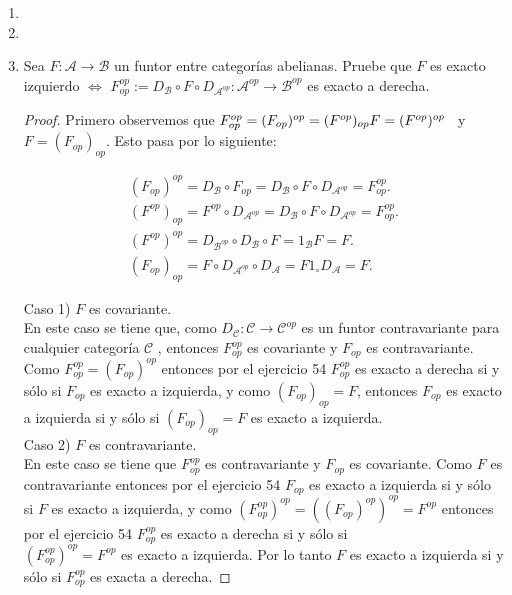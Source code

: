 \documentclass{article}
\begin{document}
\begin{enumerate}[label=\textbf{Ej \arabic*.}]
\begin{proof}
se demuestra de manera análoga a lo anterior.

\end{proof}

\item
\item

\item Sea $F:\mathscr{A}\longrightarrow \mathscr{B}$ un funtor entre categorías abelianas. Pruebe que $F$ es exacto izquierdo $\iff$ 
$F_{op}^{op}:=D_{\mathscr{B}}\circ F \circ  D_{\mathscr{A}^{op}}\colon \mathscr{A}^{op}\longrightarrow\mathscr{B}^{op}$ es exacto a 
derecha.
\begin{proof}
Primero observemos que $F_{op}^{op}=(F_{op})^{op}=(F^{op})_{op}\,\\ F=(F^{op})^{op}$\,\,\, y \,\,\, $F=(F_{op})_{op}$. 
Esto pasa por lo siguiente:

\begin{gather*}
(F_{op})^{op}=D_{\mathscr{B}}\circ F_{op}=D_{\mathscr{B}}\circ F\circ D_{\mathscr{A}^{op}}=F_{op}^{op}.\\
(F^{op})_{op}=F^{op}\circ D_{\mathscr{A}^{op}}=D_{\mathscr{B}}\circ F\circ D_{\mathscr{A}^{op}}=F_{op}^{op}.\\
(F^{op})^{op}=D_{\mathscr{B}^{op}}\circ D_{\mathscr{B}}\circ F=1_{\mathscr{B}}F=F.\\
(F_{op})_{op}=F\circ D_{\mathscr{A}^{op}}\circ D_{\mathscr{A}}=F1_\circ D_{\mathscr{A}}=F.
\end{gather*}

Caso 1) $F$ es covariante.\\

En este caso se tiene que, como $D_{\mathscr{C}}:\mathscr{C}\longrightarrow \mathscr{C}^{op}$ es un funtor contravariante para cualquier 
categoría $\mathscr{C}$ , entonces $F_{op}^{op}$ es covariante y $F_{op}$ es contravariante. Como $F_{op}^{op}=(F_{op})^{op}$ entonces
por el ejercicio 54 $F_{op}^{op}$ es exacto a derecha si y sólo si $F_{op}$ es exacto a izquierda, y como $(F_{op})_{op}=F$, entonces 
$F_{op}$ es exacto a izquierda si y sólo si $(F_{op})_{op}=F$ es exacto a izquierda.\\

Caso 2) $F$ es contravariante.\\

En este caso se tiene que $F_{op}^{op}$ es contravariante y $F_{op}$ es covariante. Como $F$ es contravariante entonces por el ejercicio 54
$F_{op}$ es exacto a izquierda si y sólo si $F$ es exacto a izquierda, y como $(F_{op}^{op})^{op}=((F_{op})^{op})^{op}=F^{op}$ entonces 
por el ejercicio 54 $F_{op}^{op}$ es exacto a derecha si y sólo si \\$(F_{op}^{op})^{op}=F^{op}$ es exacto a izquierda. Por lo tanto
$F$ es exacto a izquierda si y sólo si $F_{op}^{op}$ es exacta a derecha.


\end{proof}
\end{enumerate}
\end{document}

